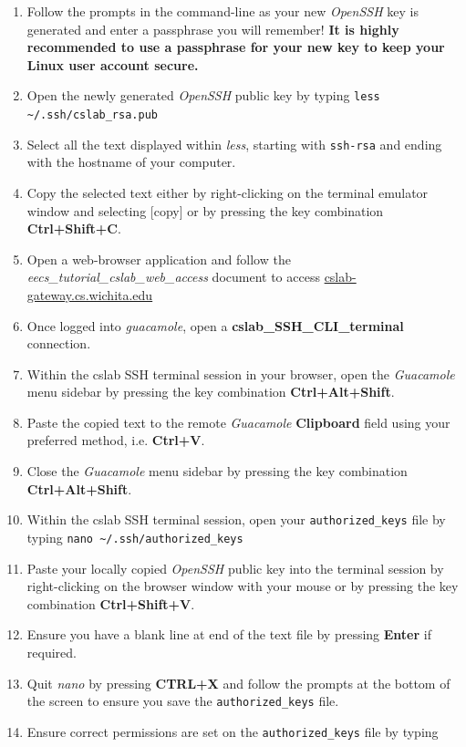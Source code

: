 \documentclass[12pt]{article}
\begin{document}
\begin{flushleft}
\begin{enumerate}
  \item Follow the prompts in the command-line as your new \textit{OpenSSH} key is generated and enter a passphrase you will remember! \break
  \textbf{It is highly recommended to use a passphrase for your new key to keep your Linux user account secure.}
  
  \item Open the newly generated \textit{OpenSSH} public key by typing \break
    \verb|less ~/.ssh/cslab_rsa.pub|
  \item Select all the text displayed within \textit{less}, starting with \texttt{ssh-rsa} and ending with the hostname of your computer.
  \item Copy the selected text either by right-clicking on the terminal emulator window and selecting [copy] or by pressing the key combination \textbf{Ctrl+Shift+C}.
  \item Open a web-browser application and follow the \textit{eecs\_tutorial\_cslab\_web\_access} document to access \href{https://cslab-gateway.cs.wichita.edu/}{cslab-gateway.cs.wichita.edu}
  \item Once logged into \textit{guacamole}, open a \textbf{cslab\_SSH\_CLI\_terminal} connection.
  \item Within the cslab SSH terminal session in your browser, open the \textit{Guacamole} menu sidebar by pressing the key combination \textbf{Ctrl+Alt+Shift}.
  \item Paste the copied text to the remote \textit{Guacamole} \textbf{Clipboard} field using your preferred method, i.e. \textbf{Ctrl+V}.
  \item Close the \textit{Guacamole} menu sidebar by pressing the key combination \textbf{Ctrl+Alt+Shift}.
  \item Within the cslab SSH terminal session, open your \texttt{authorized\_keys} file by typing \break
  \verb|nano ~/.ssh/authorized_keys|
  \item Paste your locally copied \textit{OpenSSH} public key into the terminal session by right-clicking on the browser window with your mouse or by pressing the key combination \textbf{Ctrl+Shift+V}.
  \item Ensure you have a blank line at end of the text file by pressing \textbf{Enter} if required.
  \item Quit \textit{nano} by pressing \textbf{CTRL+X} and follow the prompts at the bottom of the screen to ensure you save the \verb|authorized_keys| file.
  \item Ensure correct permissions are set on the \verb|authorized_keys| file by typing \break

\end{enumerate}
\end{flushleft}
\end{document}
